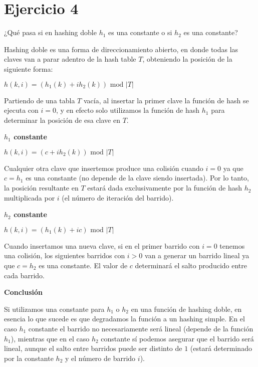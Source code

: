 \section*{Ejercicio 4}

¿Qué pasa si en hashing doble $h_1$ es una constante o si $h_2$ es una constante?

Hashing doble es una forma de direccionamiento abierto, en donde todas las claves van a parar adentro de la hash table $T$, obteniendo la posición de la siguiente forma:

$h(k, i) = (h_1(k) + i h_2(k)) \text{ mod } |T|$

Partiendo de una tabla $T$ vacía, al insertar la primer clave la función de hash se ejecuta con $i=0$, y en efecto solo utilizamos la función de hash $h_1$ para determinar la posición de esa clave en $T$.

\textbf{$h_1$ constante}

$h(k, i) = (c + i h_2(k)) \text{ mod } |T|$

Cualquier otra clave que insertemos produce una colisión cuando $i=0$ ya que $c = h_1$ es una constante (no depende de la clave siendo insertada). Por lo tanto, la posición resultante en $T$ estará dada exclusivamente por la función de hash $h_2$ multiplicada por $i$ (el número de iteración del barrido).

\textbf{$h_2$ constante}

$h(k, i) = (h_1(k) + ic) \text{ mod } |T|$

Cuando insertamos una nueva clave, si en el primer barrido con $i=0$ tenemos una colisión, los siguientes barridos con $i>0$ van a generar un barrido lineal ya que $c = h_2$ es una constante. El valor de $c$ determinará el salto producido entre cada barrido.

\textbf{Conclusión}

Si utilizamos una constante para $h_1$ o $h_2$ en una función de hashing doble, en esencia lo que sucede es que degradamos la función a un hashing simple. En el caso $h_1$ constante el barrido no necesariamente será lineal (depende de la función $h_1$), mientras que en el caso $h_2$ constante sí podemos asegurar que el barrido será lineal, aunque el salto entre barridos puede ser distinto de $1$ (estará determinado por la constante $h_2$ y el número de barrido $i$).
